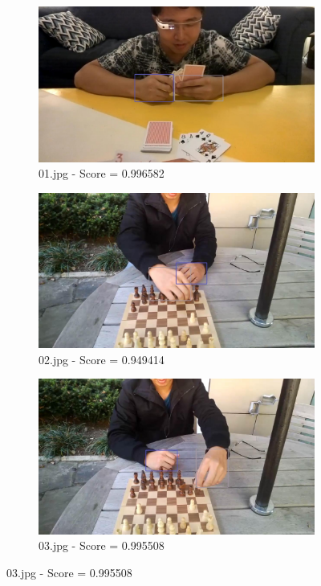 \begin{figure}[!h]
    \centering
    \begin{subfigure}[b]{0.3 \textwidth}
        \centering
        \includegraphics[width=\textwidth]{images/handDetection/01.jpg}
        \caption{01.jpg - Score = 0.996582}
        
    \end{subfigure}
    \hfill
    \begin{subfigure}[b]{0.3\textwidth}
        \centering
        \includegraphics[width=\textwidth]{images/handDetection/02.jpg}
        \caption{02.jpg - Score = 0.949414}
       
    \end{subfigure}
    \hfill
    \begin{subfigure}[b]{0.3\textwidth}
        \centering
        \includegraphics[width=\textwidth]{images/handDetection/03.jpg}
        \caption{03.jpg - Score = 0.995508}
       

\end{subfigure}
\end{figure}
